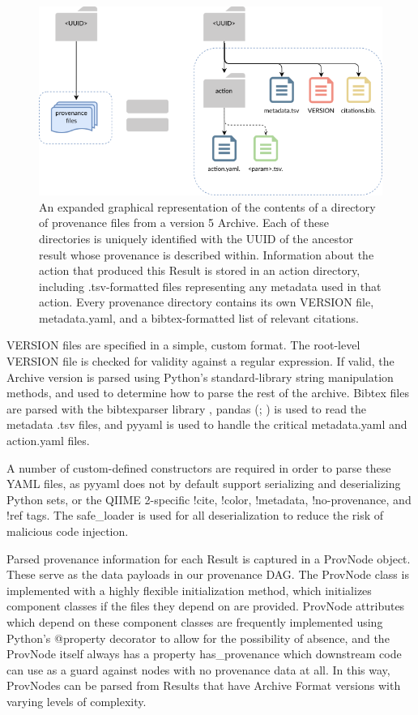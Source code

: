 \begin{figure}[htp]
\centering
\includegraphics[width=\textwidth]{figures/prov_files.png}
\caption[Diagram of the provenance file directories in a QIIME 2 Archive]%
{An expanded graphical representation of the contents of a directory of
provenance files from a version 5 Archive. Each of these directories is uniquely
identified with the UUID of the ancestor result whose provenance is described
within. Information about the action that produced this Result is stored in an
action directory, including .tsv-formatted files representing any metadata used
in that action. Every provenance directory contains its own VERSION file,
metadata.yaml, and a bibtex-formatted list of relevant citations.}
\label{fig:provenance_files}
\end{figure}
VERSION files are specified in a simple, custom format. The root-level VERSION
file is checked for validity against a regular expression. If valid, the Archive
version is parsed using Python’s standard-library string manipulation methods,
and used to determine how to parse the rest of the archive. Bibtex files are
parsed with the bibtexparser library \parencite{boulogne_bibtexparser_nodate},
pandas (\cite{reback_pandas-devpandas_2020}; \cite{mckinney_data_2010}) is used to read the
metadata .tsv files, and pyyaml is used to handle the critical metadata.yaml and
action.yaml files.

A number of custom-defined constructors are required in order to parse these
YAML files, as pyyaml does not by default support serializing and deserializing
Python sets, or the QIIME 2-specific !cite, !color, !metadata, !no-provenance,
and !ref tags. The safe\_loader is used for all deserialization to reduce the
risk of malicious code injection.

Parsed provenance information for each Result is captured in a ProvNode object.
These serve as the data payloads in our provenance DAG. The ProvNode class is
implemented with a highly flexible initialization method, which initializes
component classes if the files they depend on are provided. ProvNode attributes
which depend on these component classes are frequently implemented using
Python’s @property decorator to allow for the possibility of absence, and the
ProvNode itself always has a property has\_provenance which downstream code can
use as a guard against nodes with no provenance data at all. In this way,
ProvNodes can be parsed from Results that have Archive Format versions with
varying levels of complexity. 

